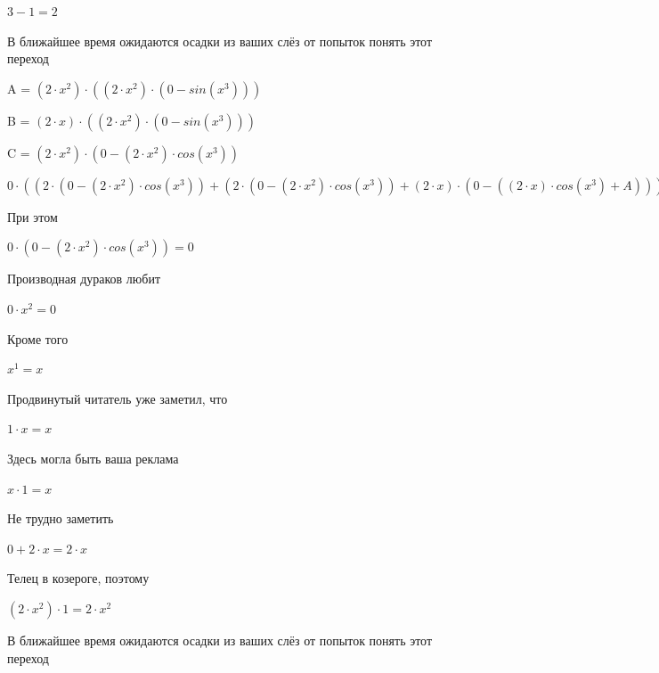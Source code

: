 \documentclass[12pt,a4paper,fleqn]{article}
\begin{document}
\begin{center}$3-1 = 2$\end{center}
В ближайшее время ожидаются осадки из ваших слёз от попыток понять этот переход

\begin{center}
A = $(2 \cdot x^{2}) \cdot ((2 \cdot x^{2}) \cdot (0-sin(x^{3})))$\end{center}
\begin{center}
B = $(2 \cdot x) \cdot ((2 \cdot x^{2}) \cdot (0-sin(x^{3})))$\end{center}
\begin{center}
C = $(2 \cdot x^{2}) \cdot (0-(2 \cdot x^{2}) \cdot cos(x^{3}))$\end{center}
\begin{center}
$0 \cdot ((2 \cdot (0-(2 \cdot x^{2}) \cdot cos(x^{3}))+(2 \cdot (0-(2 \cdot x^{2}) \cdot cos(x^{3}))+(2 \cdot x) \cdot (0-((2 \cdot x) \cdot cos(x^{3})+A))))+((2 \cdot (0-(2 \cdot x^{2}) \cdot cos(x^{3}))+(2 \cdot x) \cdot (0-((2 \cdot x) \cdot cos(x^{3})+A)))+((2 \cdot x) \cdot (0-((2 \cdot x) \cdot cos(x^{3})+A))+(2 \cdot x^{2}) \cdot (0-((2 \cdot cos(x^{3})+B)+(B+(2 \cdot x^{2}) \cdot ((2 \cdot x) \cdot (0-sin(x^{3}))+C))))))) = 0$\end{center}
При этом

\begin{center}
$0 \cdot (0-(2 \cdot x^{2}) \cdot cos(x^{3})) = 0$\end{center}
Производная дураков любит\cite{link2}

\begin{center}
$0 \cdot x^{2} = 0$\end{center}
Кроме того

\begin{center}
$x^{1} = x$\end{center}
Продвинутый читатель уже заметил, что

\begin{center}
$1 \cdot x = x$\end{center}
Здесь могла быть ваша реклама

\begin{center}
$x \cdot 1 = x$\end{center}
Не трудно заметить

\begin{center}
$0+2 \cdot x = 2 \cdot x$\end{center}
Телец в козероге, поэтому

\begin{center}
$(2 \cdot x^{2}) \cdot 1 = 2 \cdot x^{2}$\end{center}
В ближайшее время ожидаются осадки из ваших слёз от попыток понять этот переход
\end{document}
